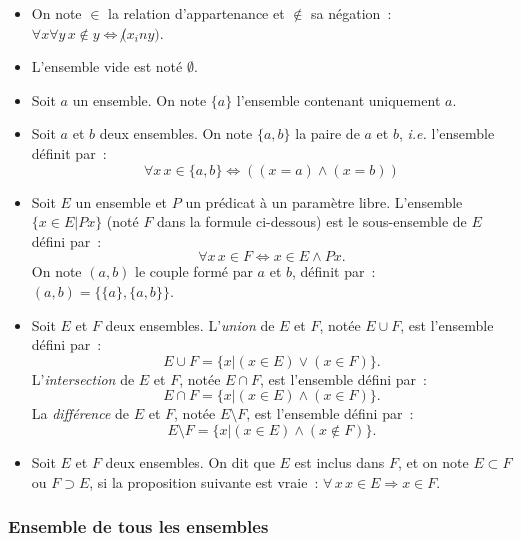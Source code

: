 \begin{itemize}
\item On note $\in$ la relation d'appartenance et $\notin$ sa négation : $\forall x \forall y \, x \notin y \Leftrightarrow \not (x _in y)$.
\item L'ensemble vide est noté $\emptyset$.
\item Soit $a$ un ensemble. 
    On note $\lbrace a \rbrace$ l'ensemble contenant uniquement $a$. 
\item Soit $a$ et $b$ deux ensembles.
    On note $\lbrace a, b \rbrace$ la paire de $a$ et $b$, \textit{i.e.} l'ensemble définit par : 
\begin{equation*}
    \forall x \, x \in \lbrace a, b \rbrace \Leftrightarrow ((x = a) \wedge (x = b))
\end{equation*}
\item Soit $E$ un ensemble et $P$ un prédicat à un paramètre libre. 
    L'ensemble $\lbrace x \in E \vert P x \rbrace$ (noté $F$ dans la formule ci-dessous) est le sous-ensemble de $E$ défini par : 
\begin{equation*}
    \forall x \, x \in F \Leftrightarrow x \in E \wedge P x. 
\end{equation*}
    On note $(a,b)$ le couple formé par $a$ et $b$, définit par : $(a,b) = \lbrace \lbrace a \rbrace, \lbrace a, b \rbrace \rbrace$.
\item Soit $E$ et $F$ deux ensembles. 
L'\textit{union} de $E$ et $F$, notée $E \cup F$, est l'ensemble défini par : 
\begin{equation*}
    E \cup F = \lbrace x \vert (x \in E) \vee (x \in F)  \rbrace . 
\end{equation*}
L'\textit{intersection} de $E$ et $F$, notée $E \cap F$, est l'ensemble défini par :
\begin{equation*}
    E \cap F = \lbrace x \vert (x \in E) \wedge (x \in F)  \rbrace. 
\end{equation*}
La \textit{différence} de $E$ et $F$, notée $E \setminus F$, est l'ensemble défini par :
\begin{equation*}
    E \setminus F = \lbrace x \vert (x \in E) \wedge (x \notin F)  \rbrace. 
\end{equation*}
\item Soit $E$ et $F$ deux ensembles.
On dit que $E$ est inclus dans $F$, et on note $E \subset F$ ou $F \supset E$, si la proposition suivante est vraie : $\forall \, x \, x \in E \Rightarrow x \in F$. 
\end{itemize}

\subsubsection{Ensemble de tous les ensembles} 

